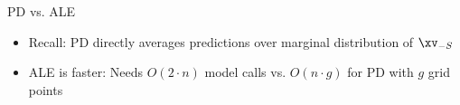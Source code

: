 \documentclass[11pt,compress,t,notes=noshow, aspectratio=169, xcolor=table]{beamer}
\begin{document}
\begin{frame}{PD vs. ALE}
    \lz
    \begin{itemize}
    \item<1-> Recall: PD directly averages predictions over marginal distribution of $\xv_{-S}$
    \item<1-> ALE is faster: Needs $O(2 \cdot n)$ model calls vs. $O(n \cdot g)$ for PD with $g$ grid points
\end{itemize}
\end{frame}
\end{document}

